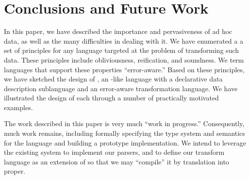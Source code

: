 \section{Conclusions and Future Work}
\label{sec:conclusion}

In this paper, we have described the importance and pervasiveness of ad hoc data, as well as the many difficulties in dealing with it.  We have enumerated a a set of principles for any language targeted at the problem of transforming such data.  These principles include obliviousness, reification, and soundness. We term languages that support these properties ``error-aware.''  
Based on these principles, we have sketched the design of \datatype{}, an \ml{}-like language with a declarative data description sublanguage and an error-aware transformation language.   We have illustrated the design of each through a number of practically motivated examples.

The work described in this paper is very much ``work in progress.''  Consequently, much work remains, including formally specifying the type system and semantics for the language and building a prototype implementation.  We intend to leverage the existing \pads{} system to implement our parsers, and to define our transform language as an extension of \sml{} so that we may ``compile'' it by translation into \sml{} proper. 



